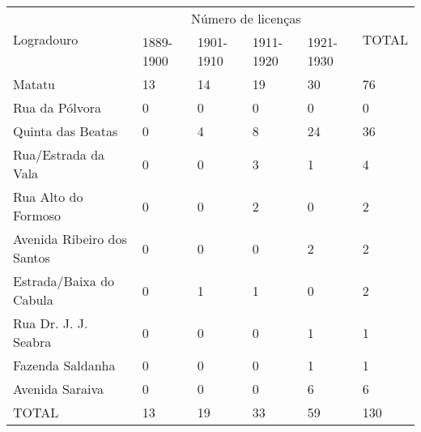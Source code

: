 \begin{table}[!htp]
{
\begin{tiny}
\begin{tabular}{llllll}
\toprule
\multirow{2}{*}{Logradouro}	& \multicolumn{4}{c}{Número de licenças}	& \multirow{2}{*}{TOTAL}\\
\cline{2-5}
	&1889-1900	&1901-1910	&1911-1920	&1921-1930	& \\
\midrule
\midrule
Matatu	&13	&14	&19	&30	&76\\
Rua da Pólvora	&0	&0	&0	&0	&0\\
Quinta das Beatas	&0	&4	&8	&24	&36\\
Rua/Estrada da Vala	&0	&0	&3	&1	&4\\
Rua Alto do Formoso	&0	&0	&2	&0	&2\\
Avenida Ribeiro dos Santos	&0	&0	&0	&2	&2\\
Estrada/Baixa do Cabula	&0	&1	&1	&0	&2\\
Rua Dr. J. J. Seabra	&0	&0	&0	&1	&1\\
Fazenda Saldanha	&0	&0	&0	&1	&1\\
Avenida Saraiva	&0	&0	&0	&6	&6\\
\midrule
TOTAL	&13	&19	&33	&59	&130\\
\bottomrule
\end{tabular} 
\end{tiny}
}
{}
\end{table}
